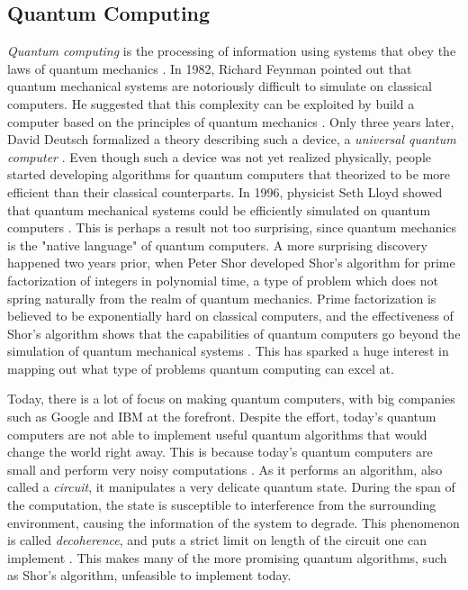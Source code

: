 \subsection{Quantum Computing}\label{sec:Quantum Computing Intro}
\emph{Quantum computing} is the processing of information using systems that obey the laws of quantum mechanics \cite{NielsenQuantum}. In 1982, Richard Feynman pointed out that quantum mechanical systems are notoriously difficult to simulate on classical computers. He suggested that this complexity can be exploited by build a computer based on the principles of quantum mechanics \cite{NielsenQuantum}. Only three years later, David Deutsch formalized a theory describing such a device, a \emph{universal quantum computer} \cite{Deutsch1985QuantumTT}. Even though such a device was not yet realized physically, people started developing algorithms for quantum computers that theorized to be more efficient than their classical counterparts. In 1996, physicist Seth Lloyd showed that quantum mechanical systems could be efficiently simulated on quantum computers \cite{Lloyd1073}. This is perhaps a result not too surprising, since quantum mechanics is the "native language" of quantum computers. A more surprising discovery happened two years prior, when Peter Shor developed Shor's algorithm for prime factorization of integers in polynomial time, a type of problem which does not spring naturally from the realm of quantum mechanics. Prime factorization is believed to be exponentially hard on classical computers, and the effectiveness of Shor's algorithm shows that the capabilities of quantum computers go beyond the simulation of quantum mechanical systems \cite{Shor_1997}.
This has sparked a huge interest in mapping out what type of problems quantum computing can excel at. 


Today, there is a lot of focus on making quantum computers, with big companies such as Google and IBM at the forefront. Despite the effort, today's quantum computers are not able to implement useful quantum algorithms that would change the world right away. This is because today's quantum computers are small and perform very noisy computations \cite{Preskill_2018}. As it performs an algorithm, also called a \emph{circuit}, it manipulates a very delicate quantum state. During the span of the computation, the state is susceptible to interference from the surrounding environment, causing the information of the system to degrade. This phenomenon is called \emph{decoherence}, and puts a strict limit on length of the circuit one can implement \cite{saki2019study}. This makes many of the more promising quantum algorithms, such as Shor's algorithm, unfeasible to implement today.


